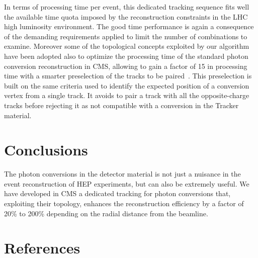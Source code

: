 \documentclass[a4paper]{jpconf}
\begin{document}
In terms of processing time per event, this dedicated tracking sequence  fits well the available time quota imposed by the reconstruction constraints in the LHC high luminosity  environment.  The good time performance is again a consequence of the demanding requirements applied to limit the number of combinations to examine.
Moreover some of the topological concepts exploited by our algorithm have been adopted also to optimize the processing time of the standard photon conversion reconstruction  in CMS, allowing to gain a factor of 15 in processing time with a smarter preselection of the tracks to be paired~\cite{recoImprovement}. This preselection is built on the same criteria used to identify the expected position of a conversion vertex from a single track. It avoids to pair a track with all the opposite-charge tracks before rejecting it as not compatible with a conversion in the Tracker material.

\section{Conclusions}
\label{section_conclusions}

The photon conversions in the detector material is not just a nuisance in the event reconstruction of HEP experiments, but can also be extremely useful. 
We have developed in CMS	a dedicated tracking for photon  conversions that,
exploiting their topology, enhances the reconstruction efficiency by a factor of 20\% to 200\% depending on the radial distance from the beamline.

\section*{References}
%



{}

%
%
\end{document}
